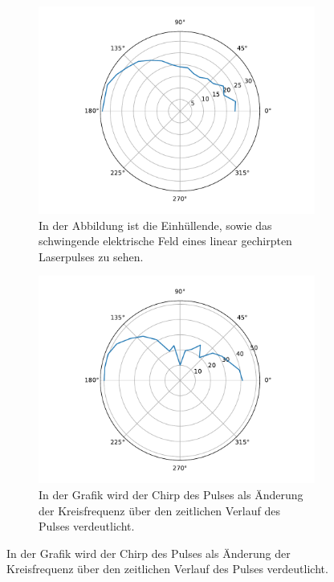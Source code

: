             \begin{figure}[ht]
                \centering
                \begin{subfigure}[b]{0.45\textwidth}
                    \centering
                    \includegraphics[scale=0.3]{./pictures/H_atom_resonanz_1_2310Hz.pdf}
                    \caption{In der Abbildung ist die Einhüllende, sowie das schwingende elektrische Feld eines linear gechirpten Laserpulses zu sehen.}
                    \label{fig:H_atom_resonanz_1_2310Hz}
                \end{subfigure}
                \hfill
                \centering
                \begin{subfigure}[b]{0.45\textwidth}
                    \centering
                    \includegraphics[scale=0.3]{./pictures/H_atom_resonanz_2_3711Hz.pdf}
                    \caption{In der Grafik wird der Chirp des Pulses als Änderung der Kreisfrequenz über den zeitlichen Verlauf des Pulses verdeutlicht.}
                    \label{fig:H_atom_resonanz_2_3711Hz}
                \end{subfigure}


\end{figure}
